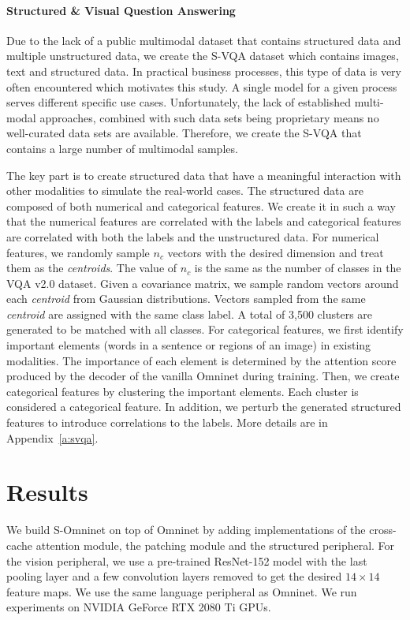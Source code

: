 \documentclass{article}
\begin{document}
\paragraph{Structured \& Visual Question Answering} Due to the lack of a public multimodal dataset that contains structured data and multiple unstructured data, we create the S-VQA dataset which contains images, text and structured data. In practical business processes, this type of data is very often encountered which motivates this study. A single model for a given process serves different specific use cases. Unfortunately, the lack of established multi-modal approaches, combined with such data sets being proprietary means no well-curated data sets are available. Therefore, we create the S-VQA that contains a large number of multimodal samples. 

The key part is to create structured data that have a meaningful interaction with other modalities to simulate the real-world cases. The structured data are composed of both numerical and categorical features. We create it in such a way that the numerical features are correlated with the labels and categorical features are correlated with both the labels and the unstructured data. For numerical features, we randomly sample $n_c$ vectors with the desired dimension and treat them as the \textit{centroids}. The value of $n_c$ is the same as the number of classes in the VQA v2.0 dataset. Given a covariance matrix, we sample random vectors around each \textit{centroid} from Gaussian distributions. Vectors sampled from the same \textit{centroid} are assigned with the same class label. A total of 3,500 clusters are generated to be matched with all classes. For categorical features, we first identify important elements (words in a sentence or regions of an image) in existing modalities. The importance of each element is determined by the attention score produced by the decoder of the vanilla Omninet during training. Then, we create categorical features by clustering the important elements. Each cluster is considered a categorical feature. In addition, we perturb the generated structured features to introduce correlations to the labels. More details are in Appendix~\ref{a:svqa}.

\section{Results}\label{sec:results}

We build S-Omninet on top of Omninet by adding implementations of the cross-cache attention module, the patching module and the structured peripheral. For the vision peripheral, we use a pre-trained ResNet-152 model \cite{he2016deep} with the last pooling layer and a few convolution layers removed to get the desired $14 \times 14$ feature maps. We use the same language peripheral as Omninet. We run experiments on NVIDIA GeForce RTX 2080 Ti GPUs.
\end{document}
